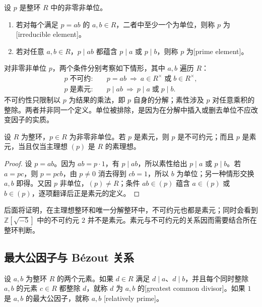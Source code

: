 \begin{definition}\label{b1:def:irreducible-prime}
	设 \(p\) 是整环 \(R\) 中的非零非单位。
	\begin{enumerate}
		\item 若对每个满足 \(p=ab\) 的 \(a,b\in R\)，二者中至少一个为单位，则称 \(p\) 为[irreducible element]。
		\item 若对任意 \(a,b\in R\)，\(p\mid ab\) 都蕴含 \(p\mid a\) 或 \(p\mid b\)，则称 \(p\) 为[prime element]。
	\end{enumerate}
\end{definition}

对非零非单位 \(p\)，两个条件分别考察如下情形，其中 \(a,b\) 遍历 \(R\)：
\[
	\begin{aligned}
		p\;\text{不可约}:&\quad p=ab\ \Longrightarrow\ a\in R^\times\;\text{或}\;b\in R^\times,\\
		p\;\text{是素元}:&\quad p\mid ab\ \Longrightarrow\ p\mid a\;\text{或}\;p\mid b.
	\end{aligned}
\]
不可约性只限制以 \(p\) 为结果的乘法，即 \(p\) 自身的分解；素性涉及 \(p\) 对任意乘积的整除。两者并非同一个定义。单位被排除，是因为在分解中插入或删去单位不应改变因子的实质。

\begin{proposition}\label{b1:prop:prime-implies-irreducible}
	设 \(R\) 为整环，\(p\in R\) 为非零非单位。若 \(p\) 是素元，则 \(p\) 是不可约元；而且 \(p\) 是素元，当且仅当主理想 \((p)\) 是 \(R\) 的素理想。
\end{proposition}
\begin{proof}
	设 \(p=ab\)。因为 \(ab=p\cdot1\)，有 \(p\mid ab\)，所以素性给出 \(p\mid a\) 或 \(p\mid b\)。若 \(a=pc\)，则 \(p=pcb\)，由 \(p\ne0\) 消去得到 \(cb=1\)，所以 \(b\) 为单位；另一种情形交换 \(a,b\) 即得。又因 \(p\) 非单位，\((p)\ne R\)；条件 \(ab\in(p)\) 蕴含 \(a\in(p)\) 或 \(b\in(p)\)，逐项翻译后正是素元的定义。
\end{proof}

后面将证明，在主理想整环和唯一分解整环中，不可约元也都是素元；同时会看到 \(\mathbb Z[\sqrt{-5}]\) 中的不可约元 \(2\) 并不是素元。素元与不可约元的关系因而需要结合所在整环判断。

\subsection{最大公因子与 Bézout 关系}
\label{b1:subsec:1101:02}

\begin{definition}\label{b1:def:gcd}
	设 \(a,b\) 为整环 \(R\) 的两个元素。如果 \(d\in R\) 满足 \(d\mid a\)、\(d\mid b\)，并且每个同时整除 \(a,b\) 的元素 \(c\in R\) 都整除 \(d\)，就称 \(d\) 为 \(a,b\) 的[greatest common divisor]。如果 \(1\) 是 \(a,b\) 的最大公因子，就称 \(a,b\) [relatively prime]。
\end{definition}


